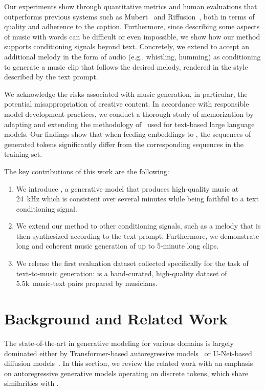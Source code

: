 Our experiments show through quantitative metrics and human evaluations that {\model} outperforms previous systems such as Mubert~\citep{Mubert} and Riffusion~\citep{riffusion}, both in terms of quality and adherence to the caption. 
Furthermore, since describing some aspects of music with words can be difficult or even impossible, we show how our method supports conditioning signals beyond text. Concretely, we extend {\model} to accept an additional melody in the form of audio (e.g., whistling, humming) as conditioning to generate a music clip that follows the desired melody, rendered in the style described by the text prompt.

We acknowledge the risks associated with music generation, in particular, the potential misappropriation of creative content. In accordance with responsible model development practices, we conduct a thorough study of memorization by adapting and extending the methodology of~\citet{carlini-memorization} used for text-based large language models. Our findings show that when feeding {\mulan} embeddings to {\model}, the sequences of generated tokens significantly differ from the corresponding sequences in the training set.

The key contributions of this work are the following:
\begin{enumerate}%
    \item We introduce {\model}, a generative model that produces high-quality music at 24~kHz which is consistent over several minutes while being faithful to a text conditioning signal.
    \item We extend our method to other conditioning signals, such as a melody that is then synthesized according to the text prompt. Furthermore, we demonstrate long and coherent music generation of up to 5-minute long clips.
    \item We release the first evaluation dataset collected specifically for the task of text-to-music generation: {\dataset} is a hand-curated, high-quality dataset of 5.5k~music-text pairs prepared by musicians.
\end{enumerate}

\label{contributions}\newpage
\section{Background and Related Work}
\label{sec:background-related}

The state-of-the-art in generative modeling for various domains is largely dominated either by Transformer-based autoregressive models~\citep{vaswani2017attention} or U-Net-based diffusion models~\citep{ho2020denoising}. In this section, we review the related work with an emphasis on autoregressive generative models operating on discrete tokens, which share similarities with {\model}.

